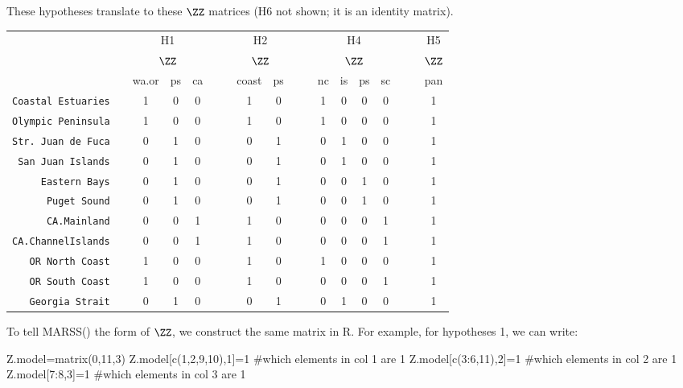 These hypotheses translate to these $\ZZ$ matrices (H6 not shown; it is an identity matrix).
\begin{table}[htdp]
\begin{center}
\begin{tabular}{rc|ccc|cc|cc|cc|cccc|cc|c|}
 && \multicolumn{3}{c|}{H1} &&& \multicolumn{2}{c|}{H2} &&& \multicolumn{4}{c|}{H4} &&& H5\\
 && \multicolumn{3}{c|}{$\ZZ$}  &&& \multicolumn{2}{c|}{$\ZZ$} &&& \multicolumn{4}{c|}{$\ZZ$} &&& $\ZZ$ \\
                          &&  wa.or & ps & ca &&& coast & ps &&& nc & is & ps & sc &&& pan \\
\texttt{Coastal Estuaries}&&  1 & 0 & 0 &&& 1 & 0 &&& 1 & 0 & 0 & 0 &&& 1 \\
\texttt{Olympic Peninsula}&&  1 & 0 & 0 &&& 1 & 0 &&& 1 & 0 & 0 & 0 &&& 1 \\
\texttt{Str. Juan de Fuca}&&  0 & 1 & 0 &&& 0 & 1 &&& 0 & 1 & 0 & 0 &&& 1 \\
\texttt{San Juan Islands} &&  0 & 1 & 0 &&& 0 & 1 &&& 0 & 1 & 0 & 0 &&& 1 \\
\texttt{Eastern Bays}     &&  0 & 1 & 0 &&& 0 & 1 &&& 0 & 0 & 1 & 0 &&& 1 \\
\texttt{Puget Sound}      &&  0 & 1 & 0 &&& 0 & 1 &&& 0 & 0 & 1 & 0 &&& 1 \\
\texttt{CA.Mainland}      &&  0 & 0 & 1 &&& 1 & 0 &&& 0 & 0 & 0 & 1 &&& 1 \\
\texttt{CA.ChannelIslands}&&  0 & 0 & 1 &&& 1 & 0 &&& 0 & 0 & 0 & 1 &&& 1 \\
\texttt{OR North Coast}   &&  1 & 0 & 0 &&& 1 & 0 &&& 1 & 0 & 0 & 0 &&& 1 \\
\texttt{OR South Coast}   &&  1 & 0 & 0 &&& 1 & 0 &&& 0 & 0 & 0 & 1 &&& 1 \\
\texttt{Georgia Strait}   &&  0 & 1 & 0 &&& 0 & 1 &&& 0 & 1 & 0 & 0 &&& 1 \\
\end{tabular} 
\end{center}
\end{table}
\bigskip

To tell MARSS() the form of $\ZZ$, we construct the same matrix in R.  For example, for hypotheses 1, we can write:
\begin{Schunk}
\begin{Sinput}
 Z.model=matrix(0,11,3)
 Z.model[c(1,2,9,10),1]=1  #which elements in col 1 are 1
 Z.model[c(3:6,11),2]=1  #which elements in col 2 are 1
 Z.model[7:8,3]=1  #which elements in col 3 are 1
\end{Sinput}
\end{Schunk}

